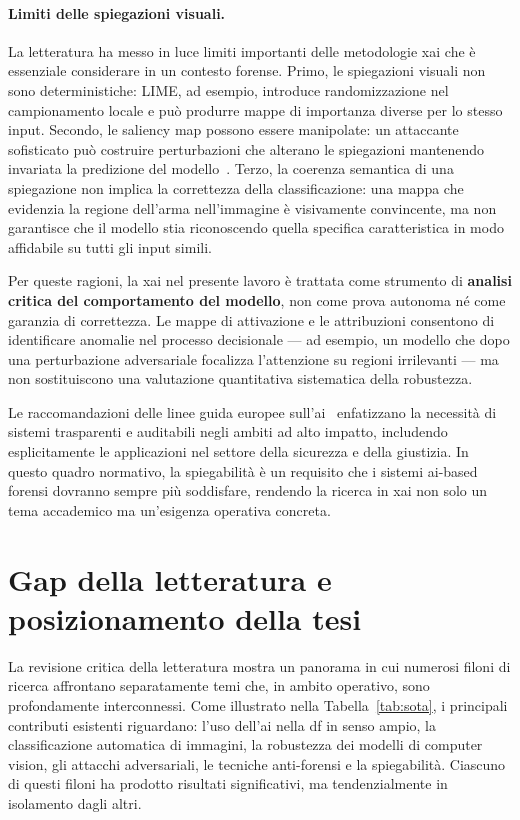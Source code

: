 \paragraph{Limiti delle spiegazioni visuali.}
La letteratura ha messo in luce limiti importanti delle metodologie \gls{xai} che è essenziale considerare in un contesto forense. Primo, le spiegazioni visuali non sono deterministiche: LIME, ad esempio, introduce randomizzazione nel campionamento locale e può produrre mappe di importanza diverse per lo stesso input. Secondo, le saliency map possono essere manipolate: un attaccante sofisticato può costruire perturbazioni che alterano le spiegazioni mantenendo invariata la predizione del modello~\cite{Carvalho2019}. Terzo, la coerenza semantica di una spiegazione non implica la correttezza della classificazione: una mappa che evidenzia la regione dell'arma nell'immagine è visivamente convincente, ma non garantisce che il modello stia riconoscendo quella specifica caratteristica in modo affidabile su tutti gli input simili.

Per queste ragioni, la \gls{xai} nel presente lavoro è trattata come strumento di \textbf{analisi critica del comportamento del modello}, non come prova autonoma né come garanzia di correttezza. Le mappe di attivazione e le attribuzioni consentono di identificare anomalie nel processo decisionale — ad esempio, un modello che dopo una perturbazione adversariale focalizza l'attenzione su regioni irrilevanti — ma non sostituiscono una valutazione quantitativa sistematica della robustezza.

Le raccomandazioni delle linee guida europee sull'\gls{ai}~\cite{aiact2024, EUAI2020} enfatizzano la necessità di sistemi trasparenti e auditabili negli ambiti ad alto impatto, includendo esplicitamente le applicazioni nel settore della sicurezza e della giustizia. In questo quadro normativo, la spiegabilità è un requisito che i sistemi \gls{ai}-based forensi dovranno sempre più soddisfare, rendendo la ricerca in \gls{xai} non solo un tema accademico ma un'esigenza operativa concreta.


\section{Gap della letteratura e posizionamento della tesi}
\label{sec:gap}

La revisione critica della letteratura mostra un panorama in cui numerosi filoni di ricerca affrontano separatamente temi che, in ambito operativo, sono profondamente interconnessi. Come illustrato nella Tabella~\ref{tab:sota}, i principali contributi esistenti riguardano: l'uso dell'\gls{ai} nella \gls{df} in senso ampio, la classificazione automatica di immagini, la robustezza dei modelli di computer vision, gli attacchi adversariali, le tecniche anti-forensi e la spiegabilità. Ciascuno di questi filoni ha prodotto risultati significativi, ma tendenzialmente in isolamento dagli altri.

